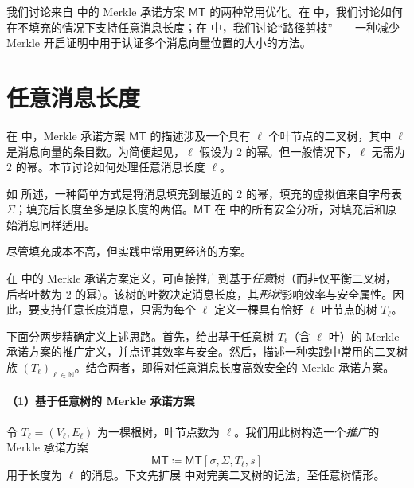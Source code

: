 \documentclass[american,singlepageview]{snargs-book-zh}
\newcommand{\DefineEqual}{\coloneqq}
\newcommand{\Naturals}{\mathbb{N}}
\newcommand{\ProtoAlphabet}{\Sigma}
\newcommand{\ROOutputSize}{\sigma}
\newcommand{\CMMessageLength}{\ell}
\newcommand{\MTGraph}{T}
\newcommand{\MTVertexSet}{V}
\newcommand{\MTEdgeSet}{E}
\newcommand{\MTSymbol}{\mathsf{MT}}
\newcommand{\MTConstructor}[4]{\MTSymbol[#1,#2,#3,#4]}
\newcommand{\MTMessageLength}{\CMMessageLength}
\newcommand{\MTSaltSize}{s}
\newcommand{\MTAlphabet}{\ProtoAlphabet}
\begin{document}
我们讨论来自  中的 Merkle 承诺方案 $\MTSymbol$ 的两种常用优化。在  中，我们讨论如何在不填充的情况下支持任意消息长度；在  中，我们讨论“路径剪枝”——一种减少 Merkle 开启证明中用于认证多个消息向量位置的大小的方法。

\section{任意消息长度}
\label{section:any-message-length}

在  中，Merkle 承诺方案 $\MTSymbol$ 的描述涉及一个具有 $\MTMessageLength$ 个叶节点的二叉树，其中 $\MTMessageLength$ 是消息向量的条目数。为简便起见，$\MTMessageLength$ 假设为 $2$ 的幂。但一般情况下，$\MTMessageLength$ 无需为 $2$ 的幂。本节讨论如何处理任意消息长度 $\MTMessageLength$。

如  所述，一种简单方式是将消息填充到最近的 $2$ 的幂，填充的虚拟值来自字母表 $\MTAlphabet$；填充后长度至多是原长度的两倍。$\MTSymbol$ 在  中的所有安全分析，对填充后和原始消息同样适用。

尽管填充成本不高，但实践中常用更经济的方案。

在  中的 Merkle 承诺方案定义，可直接推广到基于\emph{任意}树（而非仅平衡二叉树，后者叶数为 $2$ 的幂）。该树的叶数决定消息长度，其\emph{形状}影响效率与安全属性。因此，要支持任意长度消息，只需为每个 $\MTMessageLength$ 定义一棵具有恰好 $\MTMessageLength$ 叶节点的树 $\MTGraph_{\MTMessageLength}$。

下面分两步精确定义上述思路。首先，给出基于任意树 $\MTGraph_{\MTMessageLength}$（含 $\MTMessageLength$ 叶）的 Merkle 承诺方案的推广定义，并点评其效率与安全。然后，描述一种实践中常用的二叉树族 $(\MTGraph_{\MTMessageLength})_{\MTMessageLength\in\Naturals}$。结合两者，即得对任意消息长度高效安全的 Merkle 承诺方案。

\paragraph{（1）基于任意树的 Merkle 承诺方案}
令 $\MTGraph_{\MTMessageLength}=(\MTVertexSet_{\MTMessageLength},\MTEdgeSet_{\MTMessageLength})$ 为一棵根树，叶节点数为 $\MTMessageLength$。我们用此树构造一个\emph{推广}的 Merkle 承诺方案
\[
\MTSymbol \DefineEqual \MTConstructor{\ROOutputSize}{\MTAlphabet}{\MTGraph_{\MTMessageLength}}{\MTSaltSize}
\]
用于长度为 $\MTMessageLength$ 的消息。下文先扩展  中对完美二叉树的记法，至任意树情形。
\end{document}
